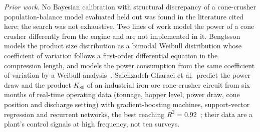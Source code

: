 \emph{Prior work.} No Bayesian calibration with structural discrepancy of a cone-crusher population-balance model evaluated held out was found in the
literature cited here; the search was not exhaustive. Two lines of work model the power of a cone crusher differently from the engine and are not
implemented in it. Bengtsson models the product size distribution as a bimodal Weibull distribution whose coefficient of variation follows a first-order
differential equation in the compression length, and models the power consumption from the same coefficient of variation by a Weibull
analysis~\cite{bengtsson2019}. Salehzadeh Gharaei
et al.\ predict the power draw and the product $K_{80}$ of an industrial iron-ore cone-crusher circuit from six months of real-time operating data
(tonnage, hopper level, power draw, cone position and discharge setting) with gradient-boosting machines, support-vector regression and recurrent
networks, the best reaching $R^2=0.92$~\cite{gharaei2024}; their data are a plant's control signals at high frequency, not ten surveys.
